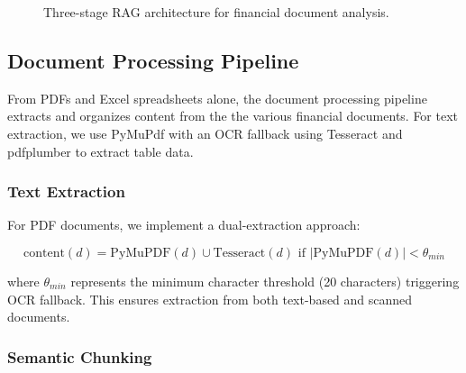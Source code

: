 \documentclass[runningheads]{llncs}
\begin{document}
\begin{figure}[h]
\centering
{}
\caption{Three-stage RAG architecture for financial document analysis.}
\label{fig:architecture}
\end{figure}

\subsection{Document Processing Pipeline}

From PDFs and Excel spreadsheets alone, the document processing pipeline extracts and organizes content from the the various financial documents. For text extraction, we use PyMuPdf with an OCR fallback using Tesseract and pdfplumber to extract table data.



\subsubsection{Text Extraction}

For PDF documents, we implement a dual-extraction approach:

\begin{equation}
\text{content}(d) = \text{PyMuPDF}(d) \cup \text{Tesseract}(d) \text{ if } |\text{PyMuPDF}(d)| < \theta_{min}
\end{equation}

where $\theta_{min}$ represents the minimum character threshold (20 characters) triggering OCR fallback. This ensures extraction from both text-based and scanned documents.

\subsubsection{Semantic Chunking}
\end{document}
